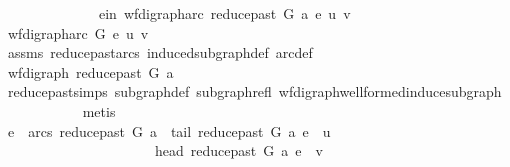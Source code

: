 \begin{isabellebody}
\ \ \ \ \isamarkupfalse%
\ {\isacharminus}{\kern0pt}\isanewline
\ \ \ \ \ \ \isamarkupfalse%
\ e{\isacharunderscore}{\kern0pt}in{\isacharcolon}{\kern0pt}\ {\isachardoublequoteopen}{\isacharparenleft}{\kern0pt}wf{\isacharunderscore}{\kern0pt}digraph{\isachardot}{\kern0pt}arc\ {\isacharparenleft}{\kern0pt}reduce{\isacharunderscore}{\kern0pt}past\ G\ a{\isacharparenright}{\kern0pt}\ e\ {\isacharparenleft}{\kern0pt}u{\isacharcomma}{\kern0pt}\ v{\isacharparenright}{\kern0pt}{\isacharparenright}{\kern0pt}{\isachardoublequoteclose}\ \isanewline
\ \ \ \ \ \ \isamarkupfalse%
\ \isamarkupfalse%
\ {\isachardoublequoteopen}{\isacharparenleft}{\kern0pt}wf{\isacharunderscore}{\kern0pt}digraph{\isachardot}{\kern0pt}arc\ G\ e\ {\isacharparenleft}{\kern0pt}u{\isacharcomma}{\kern0pt}\ v{\isacharparenright}{\kern0pt}{\isacharparenright}{\kern0pt}{\isachardoublequoteclose}\isanewline
\ \ \ \ \ \ \ \ \isamarkupfalse%
\ assms\ reduce{\isacharunderscore}{\kern0pt}past{\isacharunderscore}{\kern0pt}arcs{}\ induced{\isacharunderscore}{\kern0pt}subgraph{\isacharunderscore}{\kern0pt}def\ arc{\isacharunderscore}{\kern0pt}def\ \isanewline
\ \ \ \ \ \ \isamarkupfalse%
\ {\isacharminus}{\kern0pt}\isanewline
\ \ \ \ \ \ \ \ \isamarkupfalse%
\ {\isachardoublequoteopen}wf{\isacharunderscore}{\kern0pt}digraph\ {\isacharparenleft}{\kern0pt}reduce{\isacharunderscore}{\kern0pt}past\ G\ a{\isacharparenright}{\kern0pt}{\isachardoublequoteclose}\isanewline
\ \ \ \ \ \ \ \ \ \ \isamarkupfalse%
\ reduce{\isacharunderscore}{\kern0pt}past{\isachardot}{\kern0pt}simps\ subgraph{\isacharunderscore}{\kern0pt}def\ subgraph{\isacharunderscore}{\kern0pt}refl\ wf{\isacharunderscore}{\kern0pt}digraph{\isachardot}{\kern0pt}wellformed{\isacharunderscore}{\kern0pt}induce{\isacharunderscore}{\kern0pt}subgraph\isanewline
\ \ \ \ \ \ \ \ \ \ \isamarkupfalse%
\ metis\isanewline
\ \ \ \ \ \ \ \ \isamarkupfalse%
\ \isamarkupfalse%
\ {\isachardoublequoteopen}e\ {\isasymin}\ arcs\ {\isacharparenleft}{\kern0pt}reduce{\isacharunderscore}{\kern0pt}past\ G\ a{\isacharparenright}{\kern0pt}\ {\isasymand}\ tail\ {\isacharparenleft}{\kern0pt}reduce{\isacharunderscore}{\kern0pt}past\ G\ a{\isacharparenright}{\kern0pt}\ e\ {\isacharequal}{\kern0pt}\ u\isanewline
\ \ \ \ \ \ \ \ \ \ \ \ \ \ \ \ \ \ \ \ \ {\isasymand}\ head\ {\isacharparenleft}{\kern0pt}reduce{\isacharunderscore}{\kern0pt}past\ G\ a{\isacharparenright}{\kern0pt}\ e\ {\isacharequal}{\kern0pt}\ v{\isachardoublequoteclose}\isanewline

\end{isabellebody}
